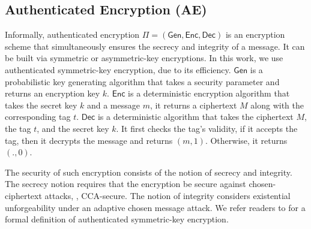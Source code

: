  
\subsection{Authenticated Encryption (AE)} 

Informally, authenticated encryption $\Pi=(\mathsf{Gen}, \mathsf{Enc}, \mathsf{Dec})$ is an encryption scheme that simultaneously ensures the secrecy and integrity of a message. It can be built via symmetric or asymmetric-key encryptions. In this work, we use authenticated symmetric-key encryption, due to its efficiency. $\mathsf{Gen}$ is a probabilistic key generating algorithm that takes a security parameter and returns an encryption key $k$. $\mathsf{Enc}$ is a deterministic encryption algorithm that takes the secret key $k$ and a message $m$, it returns a ciphertext $M$ along with the corresponding tag $t$. $\mathsf{Dec}$ is a deterministic algorithm that takes the ciphertext $M$, the tag $t$, and the secret key $k$. It first checks the tag's validity, if it accepts the tag, then it decrypts the message and returns $(m,1)$. Otherwise, it returns $(.,0)$. 


The security of such encryption consists of the notion of secrecy and integrity. The secrecy notion requires that the encryption be secure against chosen-ciphertext attacks, \ie, CCA-secure. The notion of integrity considers existential unforgeability under an adaptive chosen message attack. We refer readers to \cite{KatzLindell2014} for a formal definition of authenticated symmetric-key encryption. 




